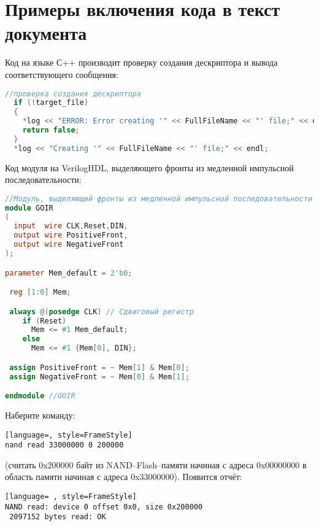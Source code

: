 \section{Примеры включения кода в текст документа}

Код на языке С++ производит проверку создания дескриптора и вывода соответствующего сообщения:
\begin{lstlisting}[language=C++, style=FrameStyle, keepspaces = true]
  //проверка создания дескриптора
  if (!target_file)
  {
    *log << "ERROR: Error creating '" << FullFileName << "' file;" << endl;
    return false;
  }
  *log << "Creating '" << FullFileName << "' file;" << endl;
\end{lstlisting}

Код модуля на VerilogHDL, выделяющего фронты из медленной импульсной последовательности:
\begin{lstlisting}[language=Verilog, style=FrameStyle, inputencoding=utf8x, extendedchars=\true, keepspaces = true]
//Модуль, выделяющий фронты из медленной импульсной последовательности
module GOIR
(
  input  wire CLK,Reset,DIN,
  output wire PositiveFront,
  output wire NegativeFront
);

parameter Mem_default = 2'b0;

 reg [1:0] Mem;

 always @(posedge CLK) // Сдвиговый регистр
    if (Reset)
      Mem <= #1 Mem_default;
    else
      Mem <= #1 {Mem[0], DIN};

 assign PositiveFront = ~ Mem[1] & Mem[0];
 assign NegativeFront = ~ Mem[0] & Mem[1];

endmodule //GOIR
\end{lstlisting}


Наберите команду:
\begin{lstlisting}[language=, style=FrameStyle]
nand read 33000000 0 200000 
\end{lstlisting}
(считать 0x200000 байт из NAND–Flash–памяти начиная с адреса 0x00000000 в область памяти начиная с адреса 0x33000000). Появится отчёт:

\begin{lstlisting}[language= , style=FrameStyle]
NAND read: device 0 offset 0x0, size 0x200000
 2097152 bytes read: OK
\end{lstlisting}











